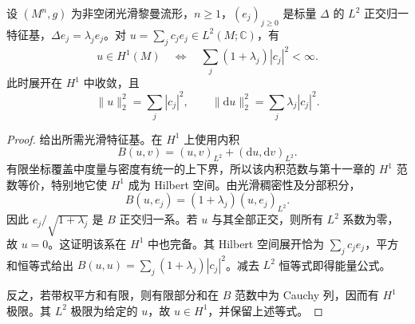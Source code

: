 \begin{lemma}\label{g3:lem:laplace-form-spectral-expansion}
	设 \((M^n,g)\) 为非空闭光滑黎曼流形，\(n\ge1\)，\((e_j)_{j\ge0}\) 是标量 \(\Delta\) 的 \(L^2\) 正交归一特征基，\(\Delta e_j=\lambda_je_j\)。对 \(u=\sum_jc_je_j\in L^2(M;\mathbb C)\)，有
	\[
		u\in H^1(M)
		\quad\Longleftrightarrow\quad
		\sum_j(1+\lambda_j)|c_j|^2<\infty.
	\]
	此时展开在 \(H^1\) 中收敛，且
	\begin{equation}\label{g3:eq:laplace-form-spectral-expansion}
		\|u\|_2^2=\sum_j|c_j|^2,\qquad
		\|\mathrm du\|_2^2=\sum_j\lambda_j|c_j|^2.
	\end{equation}
\end{lemma}
\begin{proof}
	给出所需光滑特征基。在 \(H^1\) 上使用内积
	\[
		B(u,v)=(u,v)_{L^2}+(\mathrm du,\mathrm dv)_{L^2}.
	\]
	有限坐标覆盖中度量与密度有统一的上下界，所以该内积范数与第十一章的 \(H^1\) 范数等价，特别地它使 \(H^1\) 成为 Hilbert 空间。由光滑稠密性及分部积分，
	\[
		B(u,e_j)=(1+\lambda_j)(u,e_j)_{L^2}.
	\]
	因此 \(e_j/\sqrt{1+\lambda_j}\) 是 \(B\) 正交归一系。若 \(u\) 与其全部正交，则所有 \(L^2\) 系数为零，故 \(u=0\)。这证明该系在 \(H^1\) 中也完备。其 Hilbert 空间展开恰为 \(\sum_jc_je_j\)，平方和恒等式给出
	\(B(u,u)=\sum_j(1+\lambda_j)|c_j|^2\)。减去 \(L^2\) 恒等式即得能量公式。

	反之，若带权平方和有限，则有限部分和在 \(B\) 范数中为 Cauchy 列，因而有 \(H^1\) 极限。其 \(L^2\) 极限为给定的 \(u\)，故 \(u\in H^1\)，并保留上述等式。
\end{proof}

